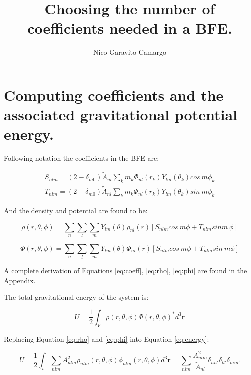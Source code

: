 \documentclass[14pt]{article}
\title{Choosing the number of coefficients needed in a BFE.}
\author{Nico Garavito-Camargo}
\date{}
\begin{document}
\maketitle

\section*{Computing coefficients and the associated gravitational potential
energy.}

Following \cite{Lowing11} notation the coefficients in the BFE are:

\begin{equation}\label{eq:coeff}
  \begin{aligned}
    S_{nlm} = (2-\delta_{m0})\tilde{A}_{nl} \sum_k m_k
  \Phi_{nl}(r_k)Y_{lm}(\theta_k) cos\ m\phi_k \\
    T_{nlm} = (2-\delta_{m0})\tilde{A}_{nl} \sum_k m_k 
  \Phi_{nl}(r_k)Y_{lm}(\theta_k) sin\ m\phi_k 
  \end{aligned}
\end{equation}

And the density and potential are found to be:


\begin{equation}\label{eq:rho}
  \rho(r, \theta, \phi) = \sum_{n} \sum_l \sum_m Y_{lm}(\theta) \rho_{nl}(r)
  \left[ S_{nlm} cos\ m \phi + T_{nlm} sin m\ \phi \right]
\end{equation}


\begin{equation}\label{eq:phi}
  \Phi(r, \theta, \phi) = \sum_{n} \sum_l \sum_m Y_{lm}(\theta) \Phi_{nl}(r)
  \left[ S_{nlm} cos\ m\phi + T_{nlm} sin\ m \phi \right]
\end{equation}

A complete derivation of Equations \ref{eq:coeff}, \ref{eq:rho}, \ref{eq:phi}
are found in the Appendix.

The total gravitational energy of the system is:

\begin{equation}\label{eq:energy}
  U = \dfrac{1}{2} \int_V \rho(r, \theta, \phi)\Phi(r,\theta, \phi)^{*} d^3
  \textbf{r}
\end{equation}

Replacing Equation \ref{eq:rho} and \ref{eq:phi} into Equation \ref{eq:energy}:

\begin{equation}
  U = \dfrac{1}{2} \int_v  \sum_{nlm} A_{nlm}^2 \rho_{nlm}(r, \theta, \phi) \phi_{nlm}(r, \theta, \phi) d^3{\textbf{r}} = \sum_{nlm}
  \frac{A_{nlm}^2}{\tilde{A}_{nl}} \delta_{nn'}\delta_{ll'}\delta_{mm'} 
\end{equation}
\end{document}
